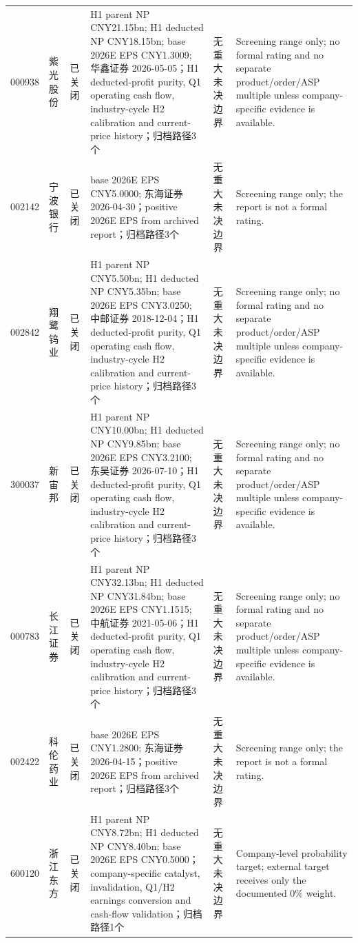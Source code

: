 \begin{longtable}{L{1.00cm}L{1.40cm}L{1.45cm}L{2.85cm}L{2.50cm}L{3.05cm}}
000938 & 紫光股份 & 已关闭 & H1 parent NP CNY21.15bn; H1 deducted NP CNY18.15bn; base 2026E EPS CNY1.3009; 华鑫证券 2026-05-05；H1 deducted-profit purity, Q1 operating cash flow, industry-cycle H2 calibration and current-price history；归档路径3个 & 无重大未决边界 & Screening range only; no formal rating and no separate product/order/ASP multiple unless company-specific evidence is available. \\
002142 & 宁波银行 & 已关闭 & base 2026E EPS CNY5.0000; 东海证券 2026-04-30；positive 2026E EPS from archived report；归档路径3个 & 无重大未决边界 & Screening range only; the report is not a formal rating. \\
002842 & 翔鹭钨业 & 已关闭 & H1 parent NP CNY5.50bn; H1 deducted NP CNY5.35bn; base 2026E EPS CNY3.0250; 中邮证券 2018-12-04；H1 deducted-profit purity, Q1 operating cash flow, industry-cycle H2 calibration and current-price history；归档路径3个 & 无重大未决边界 & Screening range only; no formal rating and no separate product/order/ASP multiple unless company-specific evidence is available. \\
300037 & 新宙邦 & 已关闭 & H1 parent NP CNY10.00bn; H1 deducted NP CNY9.85bn; base 2026E EPS CNY3.2100; 东吴证券 2026-07-10；H1 deducted-profit purity, Q1 operating cash flow, industry-cycle H2 calibration and current-price history；归档路径3个 & 无重大未决边界 & Screening range only; no formal rating and no separate product/order/ASP multiple unless company-specific evidence is available. \\
000783 & 长江证券 & 已关闭 & H1 parent NP CNY32.13bn; H1 deducted NP CNY31.84bn; base 2026E EPS CNY1.1515; 中航证券 2021-05-06；H1 deducted-profit purity, Q1 operating cash flow, industry-cycle H2 calibration and current-price history；归档路径3个 & 无重大未决边界 & Screening range only; no formal rating and no separate product/order/ASP multiple unless company-specific evidence is available. \\
002422 & 科伦药业 & 已关闭 & base 2026E EPS CNY1.2800; 东海证券 2026-04-15；positive 2026E EPS from archived report；归档路径3个 & 无重大未决边界 & Screening range only; the report is not a formal rating. \\
600120 & 浙江东方 & 已关闭 & H1 parent NP CNY8.72bn; H1 deducted NP CNY8.40bn; base 2026E EPS CNY0.5000；company-specific catalyst, invalidation, Q1/H2 earnings conversion and cash-flow validation；归档路径1个 & 无重大未决边界 & Company-level probability target; external target receives only the documented 0\% weight. \\

\end{longtable}
